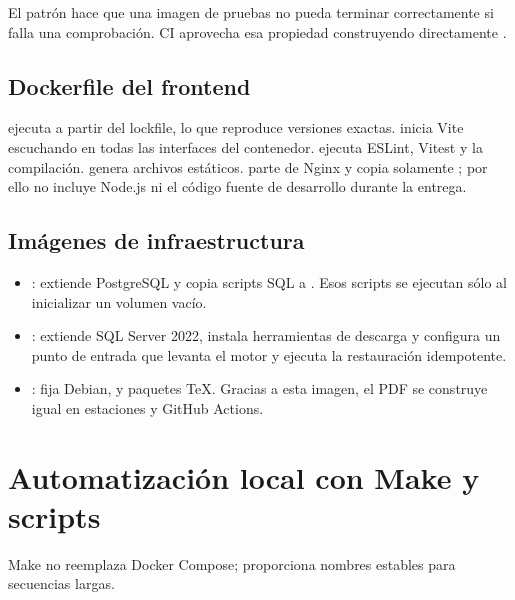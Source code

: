El patrón hace que una imagen de pruebas no pueda terminar correctamente si falla una comprobación. CI aprovecha esa propiedad construyendo directamente .

\subsection{Dockerfile del frontend}

 ejecuta  a partir del lockfile, lo que reproduce versiones exactas.  inicia Vite escuchando en todas las interfaces del contenedor.  ejecuta ESLint, Vitest y la compilación.  genera archivos estáticos.  parte de Nginx y copia solamente ; por ello no incluye Node.js ni el código fuente de desarrollo durante la entrega.

\subsection{Imágenes de infraestructura}

\begin{itemize}
  \item {}: extiende PostgreSQL y copia scripts SQL a . Esos scripts se ejecutan sólo al inicializar un volumen vacío.
  \item {}: extiende SQL Server 2022, instala herramientas de descarga y configura un punto de entrada que levanta el motor y ejecuta la restauración idempotente.
  \item {}: fija Debian,  y paquetes TeX. Gracias a esta imagen, el PDF se construye igual en estaciones y GitHub Actions.
\end{itemize}

\section{Automatización local con Make y scripts}

Make no reemplaza Docker Compose; proporciona nombres estables para secuencias largas.

